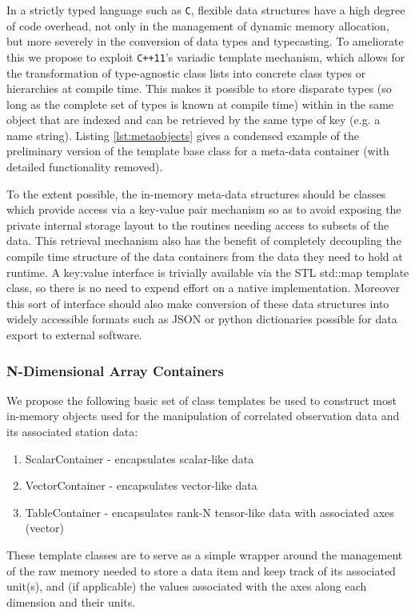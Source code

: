 \documentclass[hidelinks]{article}
\let\Oldsubsubsection\subsubsection
\renewcommand{\subsubsection}{\FloatBarrier\Oldsubsubsection}
\begin{document}
In a strictly typed language such as \texttt{C}, flexible data structures have a high degree of code overhead, not only in the management of dynamic memory allocation, but more severely in the conversion of data types and typecasting. To ameliorate this we propose to exploit \texttt{C++11}'s variadic template mechanism, which allows for the transformation of type-agnostic class lists into concrete class types or hierarchies at compile time. This makes it possible to store disparate types (so long as the complete set of types is known at compile time) within in the same object that are indexed and can be retrieved by the same type of key (e.g. a name string). Listing \ref{lst:metaobjects} gives a condensed example of the preliminary version of the template base class for a meta-data container (with detailed functionality removed).



To the extent possible, the in-memory meta-data structures should be classes which provide access via a key-value pair mechanism so as to avoid exposing the private internal storage layout to the routines needing access to subsets of the data. This retrieval mechanism also has the benefit of completely decoupling the compile
time structure of the data containers from the data they need to hold at runtime. A key:value interface is trivially available via the STL std::map template class,
so there is no need to expend effort on a native implementation. Moreover this sort of interface should also make conversion of these data structures into widely accessible formats such as JSON or python dictionaries possible for data export to external software.

\subsubsection{N-Dimensional Array Containers}

We propose the following basic set of class templates be used to construct most in-memory objects used for the manipulation of correlated observation data and its associated station data:
\begin{enumerate}
 \item ScalarContainer - encapsulates scalar-like data 
 \item VectorContainer - encapsulates vector-like data
 \item TableContainer - encapsulates rank-N tensor-like data with associated axes (vector)
\end{enumerate}
These template classes are to serve as a simple wrapper around the management of the raw memory needed to store a data item and keep track of its associated unit(s), 
and (if applicable) the values associated with the axes along each dimension and their units.
\end{document}
